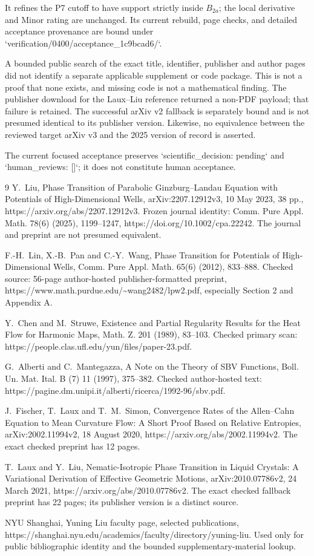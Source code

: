 \documentclass[10pt]{article}
\begin{document}
It refines the P7 cutoff to have support strictly inside \(B_{2a}\); the local derivative and Minor rating are unchanged. Its current rebuild, page checks, and detailed acceptance provenance are bound under `verification/0400/acceptance\_1c9bcad6/`.\par
A bounded public search of the exact title, identifier, publisher and author pages did not identify a separate applicable supplement or code package. This is not a proof that none exists, and missing code is not a mathematical finding. The publisher download for the Laux–Liu reference returned a non-PDF payload; that failure is retained. The successful arXiv v2 fallback is separately bound and is not presumed identical to its publisher version. Likewise, no equivalence between the reviewed target arXiv v3 and the 2025 version of record is asserted.\par
The current focused acceptance preserves `scientific\_decision: pending` and `human\_reviews: []`; it does not constitute human acceptance.\par
9 Y. Liu, Phase Transition of Parabolic Ginzburg–Landau Equation with Potentials of High-Dimensional Wells, arXiv:2207.12912v3, 10 May 2023, 38 pp., https://arxiv.org/abs/2207.12912v3. Frozen journal identity: Comm. Pure Appl. Math. 78(6) (2025), 1199–1247, https://doi.org/10.1002/cpa.22242. The journal and preprint are not presumed equivalent.\par
F.-H. Lin, X.-B. Pan and C.-Y. Wang, Phase Transition for Potentials of High-Dimensional Wells, Comm. Pure Appl. Math. 65(6) (2012), 833–888. Checked source: 56-page author-hosted publisher-formatted preprint, https://www.math.purdue.edu/\textasciitilde{}wang2482/lpw2.pdf, especially Section 2 and Appendix A.\par
Y. Chen and M. Struwe, Existence and Partial Regularity Results for the Heat Flow for Harmonic Maps, Math. Z. 201 (1989), 83–103. Checked primary scan: https://people.clas.ufl.edu/yun/files/paper-23.pdf.\par
G. Alberti and C. Mantegazza, A Note on the Theory of SBV Functions, Boll. Un. Mat. Ital. B (7) 11 (1997), 375–382. Checked author-hosted text: https://pagine.dm.unipi.it/alberti/ricerca/1992-96/sbv.pdf.\par
J. Fischer, T. Laux and T. M. Simon, Convergence Rates of the Allen–Cahn Equation to Mean Curvature Flow: A Short Proof Based on Relative Entropies, arXiv:2002.11994v2, 18 August 2020, https://arxiv.org/abs/2002.11994v2. The exact checked preprint has 12 pages.\par
T. Laux and Y. Liu, Nematic-Isotropic Phase Transition in Liquid Crystals: A Variational Derivation of Effective Geometric Motions, arXiv:2010.07786v2, 24 March 2021, https://arxiv.org/abs/2010.07786v2. The exact checked fallback preprint has 22 pages; its publisher version is a distinct source.\par
NYU Shanghai, Yuning Liu faculty page, selected publications, https://shanghai.nyu.edu/academics/faculty/directory/yuning-liu. Used only for public bibliographic identity and the bounded supplementary-material lookup.\par
\end{document}
